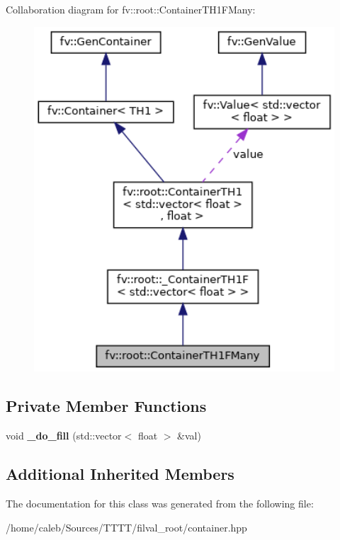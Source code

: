 Collaboration diagram for fv\+:\+:root\+:\+:Container\+T\+H1\+F\+Many\+:
\nopagebreak
\begin{figure}[H]
\begin{center}
\leavevmode
\includegraphics[width=342pt]{classfv_1_1root_1_1ContainerTH1FMany__coll__graph}
\end{center}
\end{figure}
\subsection*{Private Member Functions}
\begin{DoxyCompactItemize}
\item 
\hypertarget{classfv_1_1root_1_1ContainerTH1FMany_a326b73cef303ee804edff65c1da2d32c}{}\label{classfv_1_1root_1_1ContainerTH1FMany_a326b73cef303ee804edff65c1da2d32c} 
void {\bfseries \+\_\+do\+\_\+fill} (std\+::vector$<$ float $>$ \&val)
\end{DoxyCompactItemize}
\subsection*{Additional Inherited Members}


The documentation for this class was generated from the following file\+:\begin{DoxyCompactItemize}
\item 
/home/caleb/\+Sources/\+T\+T\+T\+T/filval\+\_\+root/container.\+hpp\end{DoxyCompactItemize}
